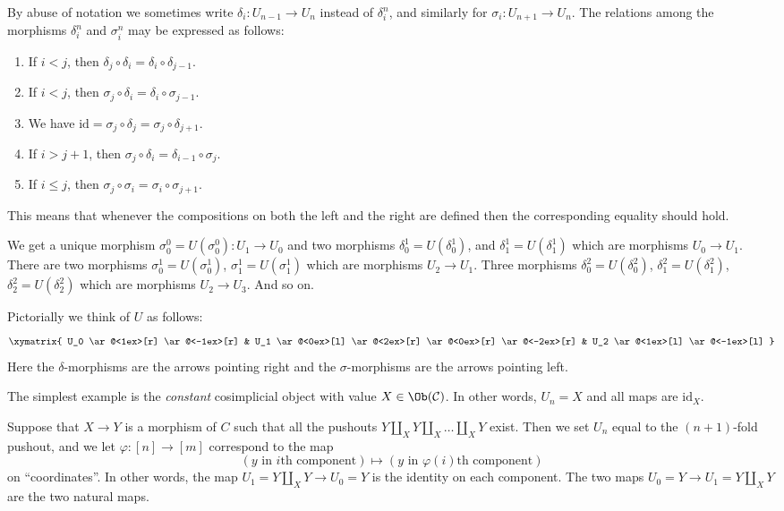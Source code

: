 \begin{remark}
\label{remark-relations-cosimplicial}
By abuse of notation we sometimes write $\delta_i : U_{n - 1} \to U_n$
instead of $\delta^n_i$, and similarly for $\sigma_i : U_{n + 1} \to U_n$.
The relations among the morphisms $\delta^n_i$ and $\sigma^n_i$
may be expressed as follows:
\begin{enumerate}
\item If $i < j$, then
$\delta_j \circ \delta_i = \delta_i \circ \delta_{j - 1}$.
\item If $i < j$, then
$\sigma_j \circ \delta_i = \delta_i \circ \sigma_{j - 1}$.
\item We have
$\text{id} = \sigma_j \circ \delta_j = \sigma_j \circ \delta_{j + 1}$.
\item If $i > j + 1$, then
$\sigma_j \circ \delta_i = \delta_{i - 1} \circ \sigma_j$.
\item If $i \leq j$, then
$\sigma_j \circ \sigma_i = \sigma_i \circ \sigma_{j + 1}$.
\end{enumerate}
This means that whenever the compositions on both the left and the
right are defined then the corresponding equality should hold.
\end{remark}

\noindent
We get a unique morphism $\sigma^0_0 = U(\sigma^0_0) : U_1 \to U_0$ and
two morphisms $\delta^1_0 = U(\delta^1_0)$, and
$\delta^1_1 = U(\delta^1_1)$ which are morphisms $U_0 \to U_1$.
There are two morphisms
$\sigma^1_0 = U(\sigma^1_0)$, $\sigma^1_1 = U(\sigma^1_1)$
which are morphisms $U_2 \to U_1$. Three morphisms
$\delta^2_0 = U(\delta^2_0)$, $\delta^2_1 = U(\delta^2_1)$,
$\delta^2_2 = U(\delta^2_2)$
which are morphisms $U_2 \to U_3$. And so on.

\medskip\noindent
Pictorially we think of $U$ as follows:
$$
\xymatrix{
U_0
\ar@<1ex>[r]
\ar@<-1ex>[r]
&
U_1
\ar@<0ex>[l]
\ar@<2ex>[r]
\ar@<0ex>[r]
\ar@<-2ex>[r]
&
U_2
\ar@<1ex>[l]
\ar@<-1ex>[l]
}
$$
Here the $\delta$-morphisms are the arrows pointing right and the
$\sigma$-morphisms are the arrows pointing left.

\begin{example}
\label{example-constant-cosimplicial-object}
The simplest example is the {\it constant} cosimplicial object with
value $X \in \Ob(\mathcal{C})$. In other words, $U_n = X$ and
all maps are $\text{id}_X$.
\end{example}

\begin{example}
\label{example-push-outs-simplicial-object}
Suppose that $X\to Y$ is a morphism of $C$ such that all
the pushouts $Y\amalg_X Y \amalg_X \ldots \amalg_X Y$ exist.
Then we set $U_n$ equal to the $(n + 1)$-fold pushout,
and we let $\varphi : [n] \to [m]$ correspond to the map
$$
(y \text{ in }i\text{th component})
\mapsto
(y \text{ in }\varphi(i)\text{th component})
$$
on ``coordinates''.
In other words, the map $U_1 = Y \amalg_X Y \to U_0 = Y$ is the
identity on each component.
The two maps $U_0 = Y \to U_1 = Y \amalg_X Y$ are the two
natural maps.
\end{example}

